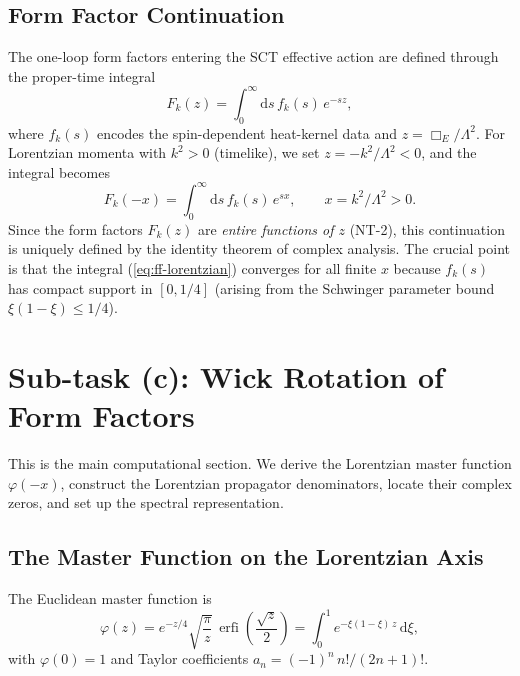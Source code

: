 \documentclass[11pt,a4paper]{article}
\theoremstyle{definition}
\theoremstyle{remark}
\newcommand{\dd}{\mathrm{d}}
\newcommand{\erfi}{\operatorname{erfi}}
\begin{document}
\subsection{Form Factor Continuation}

The one-loop form factors entering the SCT effective action are defined
through the proper-time integral
\begin{equation}
  \label{eq:ff-propertime}
  F_k(z) = \int_0^\infty \dd s\, f_k(s)\, e^{-s z},
\end{equation}
where $f_k(s)$ encodes the spin-dependent heat-kernel data and
$z = \Box_E/\Lambda^2$.  For Lorentzian momenta with $k^2 > 0$
(timelike), we set $z = -k^2/\Lambda^2 < 0$, and the integral becomes
\begin{equation}
  \label{eq:ff-lorentzian}
  F_k(-x) = \int_0^\infty \dd s\, f_k(s)\, e^{s x},
  \qquad x = k^2/\Lambda^2 > 0.
\end{equation}
Since the form factors $F_k(z)$ are \emph{entire functions of $z$}
(NT-2), this continuation is uniquely defined by the identity theorem
of complex analysis.  The crucial point is that the integral
(\ref{eq:ff-lorentzian}) converges for all finite $x$ because $f_k(s)$
has compact support in $[0, 1/4]$ (arising from the Schwinger parameter
bound $\xi(1-\xi) \leq 1/4$).


\section{Sub-task (c): Wick Rotation of Form Factors}
\label{sec:wick}

This is the main computational section.  We derive the Lorentzian
master function $\varphi(-x)$, construct the Lorentzian propagator
denominators, locate their complex zeros, and set up the spectral
representation.

\subsection{The Master Function on the Lorentzian Axis}
\label{sec:phi-lorentzian}

The Euclidean master function is
\begin{equation}
  \label{eq:phi-euclidean}
  \varphi(z) = e^{-z/4}\sqrt{\frac{\pi}{z}}\,\erfi\!\left(\frac{\sqrt{z}}{2}\right)
  = \int_0^1 e^{-\xi(1-\xi)\,z}\,\dd\xi,
\end{equation}
with $\varphi(0) = 1$ and Taylor coefficients
$a_n = (-1)^n\, n!/(2n+1)!$.
\end{document}
